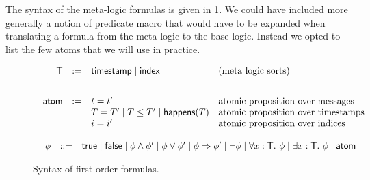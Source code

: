 \documentclass[a4paper]{article}
\theoremstyle{remark}
\begin{document}
The syntax of the meta-logic formulas is given in \cref{fig:syntax}.
We could have included more generally a notion of predicate macro that
would have to be expanded when translating a formula from the meta-logic
to the base logic. Instead we opted to list the few atoms that we
will use in practice.

\begin{figure}
  \[
  \begin{array}{c}
   \begin{array}{rcll}
    \textsf{T} &  := & \textsf{timestamp} \mid \textsf{index} & \text{(meta logic sorts)} \\
    \\[2ex]
   \textsf{atom} & := & t=t'
 & \text{atomic proposition over messages } \\
  &\mid & T=T' \mid T \leq T' \mid \textsf{happens}(T) &  \text{atomic proposition
  over timestamps } \\
  &\mid & i=i'  &  \text{atomic proposition
    over indices } \\
    \end{array}
\\
\\
     \begin{array}{rcll}
    \phi & ::= &  \textsf{true} \mid \textsf{false} \mid \phi \wedge \phi' \mid  \phi
    \vee \phi' \mid   \phi \Rightarrow \phi'\mid \neg \phi \mid
    \forall x : \textsf{T}.\ \phi \mid \exists x:\textsf{T}.\ \phi \mid \textsf{atom} &
    \end{array}

\end{array}
    \]
    \caption{Syntax of first order formulas.}\label{fig:syntax}
\end{figure}
\end{document}
